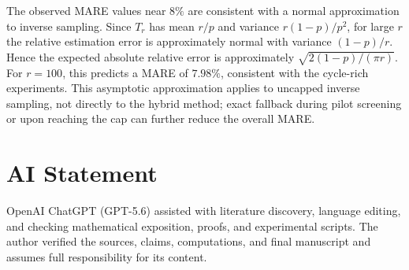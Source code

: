 \documentclass[conference]{IEEEtran}
\begin{document}
The observed MARE values near $8\%$ are consistent
with a normal approximation to inverse sampling.
Since $T_r$ has mean $r/p$ and variance
$r(1-p)/p^2$, for large $r$ the relative estimation
error is approximately normal with variance
$(1-p)/r$. Hence the expected absolute relative
error is approximately $\sqrt{2(1-p)/(\pi r)}$.
For $r=100$, this predicts a MARE of $7.98\%$,
consistent with the cycle-rich experiments.
This asymptotic approximation applies to uncapped
inverse sampling, not directly to the hybrid method;
exact fallback during pilot screening or upon
reaching the cap can further reduce the overall MARE.

\section*{AI Statement}
OpenAI ChatGPT (GPT-5.6) assisted with literature discovery, language editing,
and checking mathematical exposition, proofs, and experimental scripts.  The
author verified the sources, claims, computations, and final manuscript and
assumes full responsibility for its content.
\end{document}
